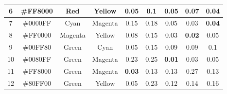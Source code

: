 \begin{table}[htbp]
{\begin{tabular}{@{}ccccccccc@{}}
    \multicolumn{1}{|c|}{6}  & \multicolumn{1}{c|}{\cellcolor[HTML]{FF8000}\#FF8000} & \multicolumn{1}{c|}{Red}     & \multicolumn{1}{c||}{Yellow}  & \multicolumn{1}{c|}{0.05}          & \multicolumn{1}{c|}{\textbf{0.1}} & \multicolumn{1}{c|}{0.05}          & \multicolumn{1}{c|}{0.07}          & \multicolumn{1}{c|}{\textbf{0.04}} \\ \midrule
    \multicolumn{1}{|c|}{7}  & \multicolumn{1}{c|}{\cellcolor[HTML]{0000FF}\#0000FF} & \multicolumn{1}{c|}{Cyan}    & \multicolumn{1}{c||}{Magenta} & \multicolumn{1}{c|}{0.15}          & \multicolumn{1}{c|}{0.18}         & \multicolumn{1}{c|}{0.05}          & \multicolumn{1}{c|}{0.03}          & \multicolumn{1}{c|}{\textbf{0.04}} \\ \midrule
    \multicolumn{1}{|c|}{8}  & \multicolumn{1}{c|}{\cellcolor[HTML]{FF0000}\#FF0000} & \multicolumn{1}{c|}{Magenta} & \multicolumn{1}{c||}{Yellow}  & \multicolumn{1}{c|}{0.08}          & \multicolumn{1}{c|}{0.15}         & \multicolumn{1}{c|}{0.03}          & \multicolumn{1}{c|}{\textbf{0.02}} & \multicolumn{1}{c|}{0.05}          \\ \midrule
    \multicolumn{1}{|c|}{9}  & \multicolumn{1}{c|}{\cellcolor[HTML]{00FF80}\#00FF80} & \multicolumn{1}{c|}{Green}   & \multicolumn{1}{c||}{Cyan}    & \multicolumn{1}{c|}{0.05}          & \multicolumn{1}{c|}{0.15}         & \multicolumn{1}{c|}{0.09}          & \multicolumn{1}{c|}{0.09}          & \multicolumn{1}{c|}{0.1}           \\ \midrule
    \multicolumn{1}{|c|}{10} & \multicolumn{1}{c|}{\cellcolor[HTML]{0080FF}\#0080FF} & \multicolumn{1}{c|}{Green}   & \multicolumn{1}{c||}{Magenta} & \multicolumn{1}{c|}{0.23}          & \multicolumn{1}{c|}{0.25}         & \multicolumn{1}{c|}{\textbf{0.01}} & \multicolumn{1}{c|}{0.03}          & \multicolumn{1}{c|}{0.05}          \\ \midrule
    \multicolumn{1}{|c|}{11} & \multicolumn{1}{c|}{\cellcolor[HTML]{FF8000}\#FF8000} & \multicolumn{1}{c|}{Green}   & \multicolumn{1}{c||}{Magenta} & \multicolumn{1}{c|}{\textbf{0.03}} & \multicolumn{1}{c|}{0.13}         & \multicolumn{1}{c|}{0.13}          & \multicolumn{1}{c|}{0.27}          & \multicolumn{1}{c|}{0.13}          \\ \midrule
    \multicolumn{1}{|c|}{12} & \multicolumn{1}{c|}{\cellcolor[HTML]{80FF00}\#80FF00} & \multicolumn{1}{c|}{Green}   & \multicolumn{1}{c||}{Yellow}  & \multicolumn{1}{c|}{0.05}          & \multicolumn{1}{c|}{0.23}         & \multicolumn{1}{c|}{0.12}          & \multicolumn{1}{c|}{0.14}          & \multicolumn{1}{c|}{0.16}          \\ \midrule

\end{tabular}}
\end{table}
